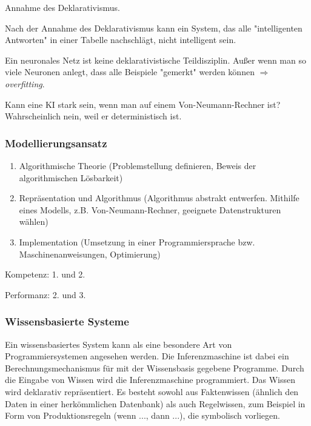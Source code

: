 \documentclass[runningheads,deutsch]{llncs}
\begin{document}
\begin{definition}{Annahme des Deklarativismus.}

    Nach der Annahme des Deklarativismus kann ein System, das alle "intelligenten Antworten" in einer Tabelle nachschlägt, nicht intelligent sein.
\end{definition}

\begin{remark}
    Ein neuronales Netz ist keine deklarativistische Teildisziplin. Außer wenn man so viele Neuronen anlegt, dass alle Beispiele "gemerkt" werden können $\Rightarrow$ \textit{overfitting}.
\end{remark}


\begin{remark}{Kann eine KI stark sein, wenn man auf einem Von-Neumann-Rechner ist?}
    Wahrscheinlich nein, weil er deterministisch ist.
\end{remark}

\subsubsection{Modellierungsansatz}

\begin{enumerate}
    \item Algorithmische Theorie (Problemstellung definieren, Beweis der algorithmischen Lösbarkeit)

    \item Repräsentation und Algorithmus (Algorithmus abstrakt entwerfen. Mithilfe eines Modells, z.B. Von-Neumann-Rechner, geeignete Datenstrukturen wählen)

    \item Implementation (Umsetzung in einer Programmiersprache bzw. Maschinenanweisungen, Optimierung)
\end{enumerate}

Kompetenz: 1. und 2.

Performanz: 2. und 3.

\subsubsection{Wissensbasierte Systeme}

Ein wissensbasiertes System kann als eine besondere Art von Programmiersystemen angesehen werden. Die Inferenzmaschine ist dabei ein Berechnungsmechanismus für mit der Wissensbasis gegebene Programme. Durch die Eingabe von Wissen wird die Inferenzmaschine programmiert. Das Wissen wird deklarativ repräsentiert. Es besteht sowohl aus Faktenwissen (ähnlich den Daten in einer herkömmlichen Datenbank) als auch Regelwissen, zum Beispiel in Form von Produktionsregeln (wenn ..., dann ...), die symbolisch vorliegen. 
\end{document}
